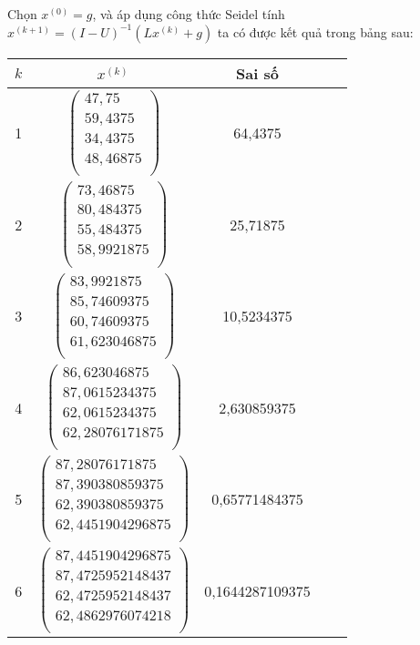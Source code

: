 Chọn $x^{(0)}=g$, và áp dụng công thức Seidel tính $x^{(k+1)}=(I-U)^{-1}(Lx^{(k)}+g)$ ta có được kết quả trong bảng sau:
\begin{center}\begin{tabular}{|c|c|c|c|c|}\hline
$k$&$x^{(k)}$&Sai số\\\hline
1&$\begin{pmatrix}47,75\\59,4375\\34,4375\\48,46875\\\end{pmatrix}$&64,4375\\\hline
2&$\begin{pmatrix}73,46875\\80,484375\\55,484375\\58,9921875\\\end{pmatrix}$&25,71875\\\hline
3&$\begin{pmatrix}83,9921875\\85,74609375\\60,74609375\\61,623046875\\\end{pmatrix}$&10,5234375\\\hline
4&$\begin{pmatrix}86,623046875\\87,0615234375\\62,0615234375\\62,28076171875\\\end{pmatrix}$&2,630859375\\\hline
5&$\begin{pmatrix}87,28076171875\\87,390380859375\\62,390380859375\\62,4451904296875\\\end{pmatrix}$&0,65771484375\\\hline
6&$\begin{pmatrix}87,4451904296875\\87,4725952148437\\62,4725952148437\\62,4862976074218\\\end{pmatrix}$&0,1644287109375\\\hline

\end{tabular}
\end{center}
